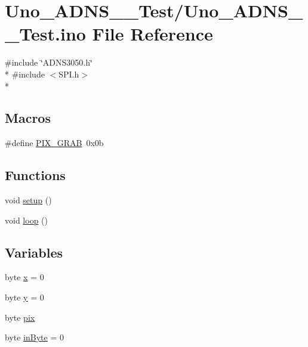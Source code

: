\hypertarget{Uno__ADNS__3050__Test_8ino}{\section{Uno\-\_\-\-A\-D\-N\-S\-\_\-\_\-\-Test/\-Uno\-\_\-\-A\-D\-N\-S\-\_\-\_\-\-Test.ino File Reference}
\label{Uno__ADNS__3050__Test_8ino}
}
{\ttfamily \#include \char`\"{}A\-D\-N\-S3050.\-h\char`\"{}}\\*
{\ttfamily \#include $<$S\-P\-I.\-h$>$}\\*
\subsection*{Macros}
\begin{DoxyCompactItemize}
\item 
\#define \hyperlink{Uno__ADNS__3050__Test_8ino_a67df1f251f0733b2e7e4ed591565c1de}{P\-I\-X\-\_\-\-G\-R\-A\-B}~0x0b
\end{DoxyCompactItemize}
\subsection*{Functions}
\begin{DoxyCompactItemize}
\item 
void \hyperlink{Uno__ADNS__3050__Test_8ino_a4fc01d736fe50cf5b977f755b675f11d}{setup} ()
\item 
void \hyperlink{Uno__ADNS__3050__Test_8ino_afe461d27b9c48d5921c00d521181f12f}{loop} ()
\end{DoxyCompactItemize}
\subsection*{Variables}
\begin{DoxyCompactItemize}
\item 
byte \hyperlink{Uno__ADNS__3050__Test_8ino_ac8eed5648fb8a5f8f8c3c424a4590195}{x} = 0
\item 
byte \hyperlink{Uno__ADNS__3050__Test_8ino_aebf2b5dbc6a584b8a658c089a78c6132}{y} = 0
\item 
byte \hyperlink{Uno__ADNS__3050__Test_8ino_afff71f4b34d167a8e437bdb5c50d31be}{pix}
\item 
byte \hyperlink{Uno__ADNS__3050__Test_8ino_a62cd173143ff9c15a38fd17ab56970c9}{in\-Byte} = 0
\end{DoxyCompactItemize}


